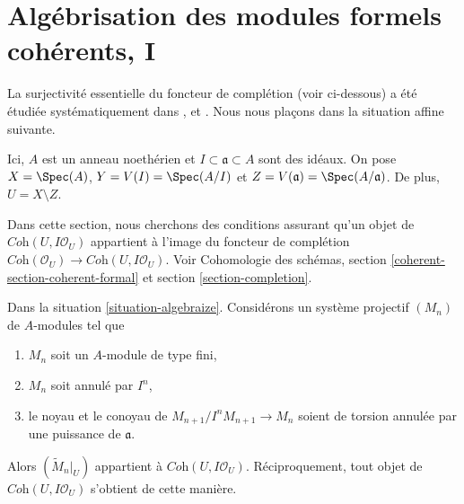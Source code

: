 \section{Algébrisation des modules formels cohérents, I}
\label{section-algebraization-modules}

\noindent
La surjectivité essentielle du foncteur de complétion (voir ci-dessous)
a été étudiée systématiquement dans
\cite{SGA2}, \cite{MRaynaud-book} et \cite{MRaynaud-paper}.
Nous nous plaçons dans la situation affine suivante.

\begin{situation}
\label{situation-algebraize}
Ici, $A$ est un anneau noethérien et $I \subset \mathfrak a \subset A$ sont des idéaux.
On pose $X = \Spec(A)$, $Y = V(I) = \Spec(A/I)$ et
$Z = V(\mathfrak a) = \Spec(A/\mathfrak a)$. De plus, $U = X \setminus Z$.
\end{situation}

\noindent
Dans cette section, nous cherchons des conditions assurant qu'un objet
de $\textit{Coh}(U, I\mathcal{O}_U)$ appartient à l'image du foncteur de complétion
$\textit{Coh}(\mathcal{O}_U) \to \textit{Coh}(U, I\mathcal{O}_U)$.
Voir Cohomologie des schémas, section \ref{coherent-section-coherent-formal} et
section \ref{section-completion}.

\begin{lemma}
\label{lemma-system-of-modules}
Dans la situation \ref{situation-algebraize}.
Considérons un système projectif $(M_n)$ de $A$-modules tel
que
\begin{enumerate}
\item $M_n$ soit un $A$-module de type fini,
\item $M_n$ soit annulé par $I^n$,
\item le noyau et le conoyau de $M_{n + 1}/I^nM_{n + 1} \to M_n$
soient de torsion annulée par une puissance de $\mathfrak a$.
\end{enumerate}
Alors $(\widetilde{M}_n|_U)$ appartient à $\textit{Coh}(U, I\mathcal{O}_U)$.
Réciproquement, tout objet de $\textit{Coh}(U, I\mathcal{O}_U)$
s'obtient de cette manière.
\end{lemma}

